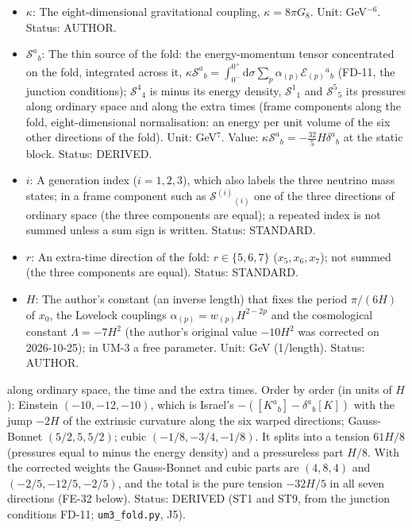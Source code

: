 \documentclass[
  10pt,
]{article}
\providecommand{\tightlist}{%
  \setlength{\itemsep}{0pt}\setlength{\parskip}{0pt}}
\begin{document}
\begin{itemize}
\tightlist
\item
  \(\kappa\): The eight-dimensional gravitational coupling,
  \(\kappa = 8\pi G_8\). Unit: GeV\(^{-6}\). Status: AUTHOR.
\item
  \(\mathcal{S}^a{}_b\): The thin source of the fold: the
  energy-momentum tensor concentrated on the fold, integrated across it,
  \(\kappa\mathcal{S}^a{}_b = \int_{0^-}^{0^+}\mathrm{d}\sigma\sum_p\alpha_{(p)}\mathcal{E}_{(p)}{}^a{}_b\)
  (FD-11, the junction conditions); \(\mathcal{S}^4{}_4\) is minus its
  energy density, \(\mathcal{S}^1{}_1\) and \(\mathcal{S}^5{}_5\) its
  pressures along ordinary space and along the extra times (frame
  components along the fold, eight-dimensional normalisation: an energy
  per unit volume of the six other directions of the fold). Unit:
  GeV\(^7\). Value:
  \(\kappa\mathcal{S}^a{}_b = -\frac{32}{5}H\delta^a{}_b\) at the static
  block. Status: DERIVED.
\item
  \(i\): A generation index (\(i = 1, 2, 3\)), which also labels the
  three neutrino mass states; in a frame component such as
  \(\mathcal{S}^{(i)}{}_{(i)}\) one of the three directions of ordinary
  space (the three components are equal); a repeated index is not summed
  unless a sum sign is written. Status: STANDARD.
\item
  \(r\): An extra-time direction of the fold: \(r \in \{5, 6, 7\}\)
  (\(x_5, x_6, x_7\)); not summed (the three components are equal).
  Status: STANDARD.
\item
  \(H\): The author's constant (an inverse length) that fixes the period
  \(\pi/(6H)\) of \(x_0\), the Lovelock couplings
  \(\alpha_{(p)} = w_{(p)}H^{2-2p}\) and the cosmological constant
  \(\Lambda = -7H^2\) (the author's original value \(-10H^2\) was
  corrected on 2026-10-25); in UM-3 a free parameter. Unit: GeV
  (1/length). Status: AUTHOR.
\end{itemize}

along ordinary space, the time and the extra times. Order by order (in
units of \(H\)): Einstein \((-10, -12, -10)\), which is Israel's
\(-([K^a{}_b] - \delta^a{}_b[K])\) with the jump \(-2H\) of the
extrinsic curvature along the six warped directions; Gauss-Bonnet
\((5/2, 5, 5/2)\); cubic \((-1/8, -3/4, -1/8)\). It splits into a
tension \(61H/8\) (pressures equal to minus the energy density) and a
pressureless part \(H/8\). With the corrected weights the Gauss-Bonnet
and cubic parts are \((4, 8, 4)\) and \((-2/5, -12/5, -2/5)\), and the
total is the pure tension \(-32H/5\) in all seven directions (FE-32
below). Status: DERIVED (ST1 and ST9, from the junction conditions
FD-11; \texttt{um3\_fold.py}, J5).
\end{document}
